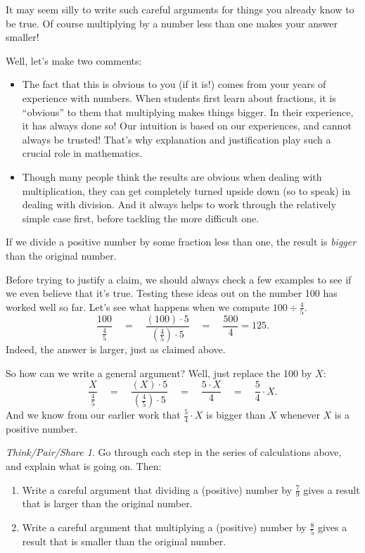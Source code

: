 \documentclass[10pt, reqno]{amsart}
\theoremstyle{remark}
\newtheorem*{thinkpair*}{Think/Pair/Share}
\theoremstyle{definition}
\numberwithin{equation}{section}  %
\begin{document}
It may seem silly to write such careful arguments for things you already know to be true.  Of course multiplying by a number less than one makes your answer smaller!

Well, let's make two comments:
\begin{itemize}
\item
The fact that this is obvious to you (if it is!) comes from your years of experience with numbers.  When students first learn about fractions, it is ``obvious'' to them that multiplying makes things bigger.  In their experience, it has always done so!  Our intuition is based on our experiences, and cannot always be trusted!  That's why explanation and justification play such a crucial role in mathematics.
\item
Though many people think the results are obvious when dealing with multiplication, they can get completely turned upside down (so to speak) in dealing with division.  And it always helps to work through the relatively simple case first, before tackling the more difficult one.
\end{itemize}


 If we divide a positive number by some fraction less than one, the result is \emph{bigger} than the original number.

Before trying to justify a claim, we should always check a few examples to see if we even believe that it's true.  Testing these ideas out on the number 100 has worked well so far.  Let's see what happens when we compute $100 \div \frac 4 5.$
\[
\frac{100}{\frac 4 5} 
\quad
=
\quad
\frac{(100)\cdot 5}{\left(\frac 4 5\right)\cdot 5 }
\quad 
=
\quad
\frac{500}4 = 125.
\]
Indeed, the answer is larger, just as claimed above.

So how can we write a general argument?  Well, just replace the 100 by $X$:
\[
\frac{X}{\frac 4 5} 
\quad
=
\quad
\frac{(X)\cdot 5}{\left(\frac 4 5\right)\cdot 5 }
\quad 
=
\quad
\frac{5\cdot X}{4}
\quad 
=
\quad
\frac{5}4 \cdot X.
\]
And we know from our earlier work that $\frac 5 4 \cdot X$ is bigger than $X$ whenever $X$ is a positive number.



\begin{thinkpair*}
Go through each step in the series of calculations above, and explain what is going on.    Then:
\begin{enumerate}
\item
Write a careful argument that dividing a (positive) number by $\frac 7 9$ gives a result that is larger than the original number.\\
\item
 Write a careful argument that multiplying a (positive) number by $\frac 8 5$ gives a result that is smaller than the original number.\\
 \end{enumerate}

\end{thinkpair*}
\end{document}
